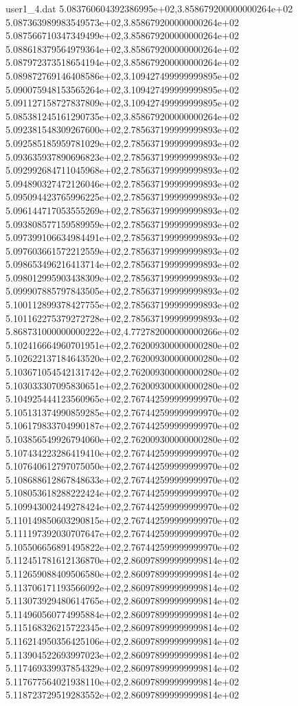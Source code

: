 \begin{filecontents}{user1_4.dat}
5.083760604392386995e+02,3.858679200000000264e+02
5.087363989983549573e+02,3.858679200000000264e+02
5.087566710347349499e+02,3.858679200000000264e+02
5.088618379564979364e+02,3.858679200000000264e+02
5.087972373518654194e+02,3.858679200000000264e+02
5.089872769146408586e+02,3.109427499999999895e+02
5.090075948153565264e+02,3.109427499999999895e+02
5.091127158727837809e+02,3.109427499999999895e+02
5.085381245161290735e+02,3.858679200000000264e+02
5.092381548309267600e+02,2.785637199999999893e+02
5.092585185959781029e+02,2.785637199999999893e+02
5.093635937890696823e+02,2.785637199999999893e+02
5.092992684711045968e+02,2.785637199999999893e+02
5.094890327472126046e+02,2.785637199999999893e+02
5.095094423765996225e+02,2.785637199999999893e+02
5.096144717053555269e+02,2.785637199999999893e+02
5.093808577159589959e+02,2.785637199999999893e+02
5.097399106634984491e+02,2.785637199999999893e+02
5.097603661572212559e+02,2.785637199999999893e+02
5.098653496216413714e+02,2.785637199999999893e+02
5.098012995903438309e+02,2.785637199999999893e+02
5.099907885797843505e+02,2.785637199999999893e+02
5.100112899378427755e+02,2.785637199999999893e+02
5.101162275379272728e+02,2.785637199999999893e+02
5.868731000000000222e+02,4.772782000000000266e+02
5.102416664960701951e+02,2.762009300000000280e+02
5.102622137184643520e+02,2.762009300000000280e+02
5.103671054542131742e+02,2.762009300000000280e+02
5.103033307095830651e+02,2.762009300000000280e+02
5.104925444123560965e+02,2.767442599999999970e+02
5.105131374990859285e+02,2.767442599999999970e+02
5.106179833704990187e+02,2.767442599999999970e+02
5.103856549926794060e+02,2.762009300000000280e+02
5.107434223286419410e+02,2.767442599999999970e+02
5.107640612797075050e+02,2.767442599999999970e+02
5.108688612867848633e+02,2.767442599999999970e+02
5.108053618288222424e+02,2.767442599999999970e+02
5.109943002449278424e+02,2.767442599999999970e+02
5.110149850603290815e+02,2.767442599999999970e+02
5.111197392030707647e+02,2.767442599999999970e+02
5.105506656891495822e+02,2.767442599999999970e+02
5.112451781612136870e+02,2.860978999999999814e+02
5.112659088409506580e+02,2.860978999999999814e+02
5.113706171193566092e+02,2.860978999999999814e+02
5.113073929480614765e+02,2.860978999999999814e+02
5.114960560774995884e+02,2.860978999999999814e+02
5.115168326215722345e+02,2.860978999999999814e+02
5.116214950356425106e+02,2.860978999999999814e+02
5.113904522693997023e+02,2.860978999999999814e+02
5.117469339937854329e+02,2.860978999999999814e+02
5.117677564021938110e+02,2.860978999999999814e+02
5.118723729519283552e+02,2.860978999999999814e+02

\end{filecontents}
